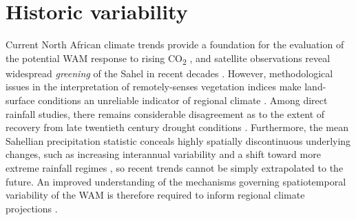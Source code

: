 \documentclass[a4paper]{article}
\begin{document}
\section*{Historic variability}
Current North African climate trends provide a foundation for the evaluation of the potential WAM response to rising CO\textsubscript{2} \parencite{redelsperger2006african}, and satellite observations reveal widespread \emph{greening} of the Sahel in recent decades \parencite{olsson2005recent, dardel2014re}.
However, methodological issues in the interpretation of remotely-senses vegetation indices make land-surface conditions an unreliable indicator of regional climate \parencite{fensholt2013assessing, dardel2014rain}.
Among direct rainfall studies, there remains considerable disagreement as to the extent of recovery from late twentieth century drought conditions \parencite{nicholson2005question, nicholson2013west}.
Furthermore, the mean Sahellian precipitation statistic conceals highly spatially discontinuous underlying changes, such as increasing interannual variability and a shift toward more extreme rainfall regimes \parencite{nicholson2013west, lebel2009recent, panthou2014recent}, so recent trends cannot be simply extrapolated to the future.
An improved understanding of the mechanisms governing spatiotemporal variability of the WAM is therefore required to inform regional climate projections \parencite{redelsperger2006african}.
\end{document}
